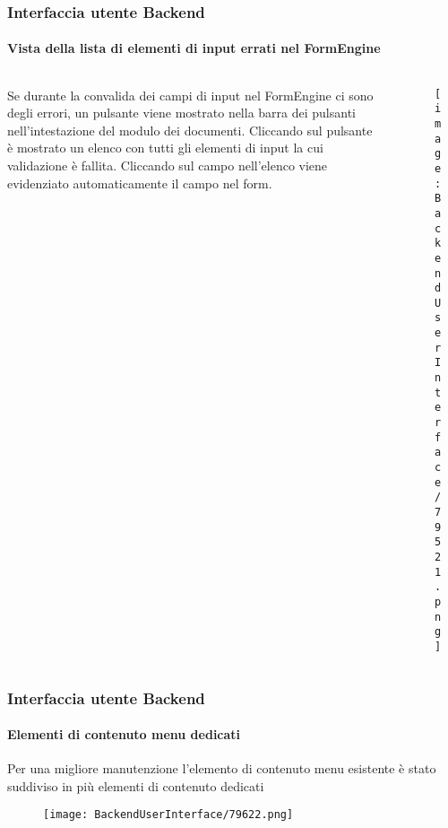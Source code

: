 \begin{frame}[fragile]
	\frametitle{Interfaccia utente Backend}
	\framesubtitle{Vista della lista di elementi di input errati nel FormEngine}

	\begin{columns}[T]
		\begin{column}{.45\textwidth}
			Se durante la convalida dei campi di input nel FormEngine ci sono degli errori, un pulsante
			viene mostrato nella barra dei pulsanti nell'intestazione del modulo dei documenti.
			Cliccando sul pulsante è mostrato un elenco con tutti gli elementi di input la cui validazione
			è fallita. Cliccando sul campo nell'elenco viene evidenziato automaticamente il campo nel form.
		\end{column}

		\begin{column}{.55\textwidth}
			\begin{figure}\vspace*{-0.6cm}
				\texttt{[image: BackendUserInterface/79521.png]}
			\end{figure}
		\end{column}
	\end{columns}

\end{frame}

\begin{frame}[fragile]
	\frametitle{Interfaccia utente Backend}
	\framesubtitle{Elementi di contenuto menu dedicati}

	Per una migliore manutenzione l'elemento di contenuto menu esistente è stato suddiviso 
	in più elementi di contenuto dedicati

	\begin{figure}\vspace{-0.2cm}
		\texttt{[image: BackendUserInterface/79622.png]}
	\end{figure}

\end{frame}


